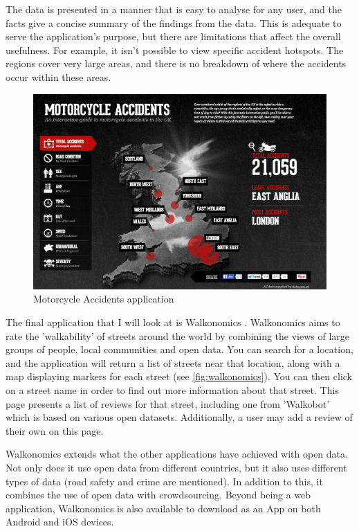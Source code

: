 \documentclass[authoryearcitations]{UoYCSproject}
\begin{document}
The data is presented in a manner that is easy to analyse for any user, and the facts give a concise summary of the findings from the data. This is adequate to serve the application's purpose, but there are limitations that affect the overall usefulness. For example, it isn't possible to view specific accident hotspots. The regions cover very large areas, and there is no breakdown of where the accidents occur within these areas.

\begin{figure}
	\includegraphics[scale=0.3]{motorcycle}
	\caption{Motorcycle Accidents application}
	\label{fig:motorcycle}
\end{figure}

The final application that I will look at is Walkonomics \citep{Davies}. Walkonomics aims to rate the 'walkability' of streets around the world by combining the views of large groups of people, local communities and open data. You can search for a location, and the application will return a list of streets near that location, along with a map displaying markers for each street (see \autoref{fig:walkonomics}). You can then click on a street name in order to find out more information about that street. This page presents a list of reviews for that street, including one from 'Walkobot' which is based on various open datasets. Additionally, a user may add a review of their own on this page. 

Walkonomics extends what the other applications have achieved with open data. Not only does it use open data from different countries, but it also uses different types of data (road safety and crime are mentioned). In addition to this, it combines the use of open data with crowdsourcing. Beyond being a web application, Walkonomics is also available to download as an App on both Android and iOS devices.
\end{document}
